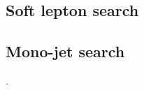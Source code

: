 \documentclass[12pt,twoside,book]{article}
\begin{document}
\subsection{Soft lepton search}
\label{sec:soft_lepton}



\subsection{Mono-jet search}
\label{sec:mono-jet}

 \cite{Baer:2014cua}.


% 
% 
\end{document}
